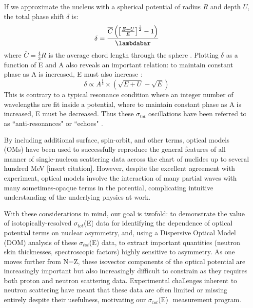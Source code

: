 \documentclass[twocolumn,secnumarabic,amssymb, nobibnotes, aps, prl,
superscriptaddress, nobalancelastpage]{revtex4}
\newcommand{\tots}{\ensuremath{\sigma_{tot}}\,\,}
\newcommand{\totEs}{\ensuremath{\sigma_{tot}}(E)\,\,}
\begin{document}
If we approximate the nucleus with a
spherical potential of radius $R$ and depth $U$, the total phase shift $\delta$ is:
\begin{equation} \label{phaseShift}
    \delta =
    \frac{\overline{C}\left(\left[{\frac{E+U}{E}}\right]^{\frac{1}{2}}-1\right)}{\lambdabar}
\end{equation}
where $\overline{C} = \frac{4}{3}R$ is the average chord length through the
sphere \cite{Angeli1970}. Plotting $\delta$ as a function of E and A also reveals an important
relation: to maintain constant phase as A is increased, E must also increase 
\cite{Satchler1980, Peterson1962}:
\begin{equation}
    \delta \propto A^{\frac{1}{3}}\times\left(\sqrt{E+U}-\sqrt{E}\right)
\end{equation}
This is contrary to a typical resonance condition where an integer number of wavelengths
are fit inside a potential, where to maintain constant phase as A is increased,
E must be decreased. Thus these \tots oscillations have been referred to as
``anti-resonances" or ``echoes" \cite{Satchler1980, McVoy1967}.

By including additional surface, spin-orbit, and other terms, optical models (OMs) have been 
used to successfully reproduce the general features of all manner of single-nucleon scattering 
data across the chart of nuclides up to several hundred MeV [insert citation].
However, despite the excellent agreement with experiment, optical models
involve the interaction of many partial waves with many sometimes-opaque terms
in the potential, complicating intuitive understanding of the underlying
physics at work.

With these considerations in mind, our goal is twofold: to demonstrate the
value of isotopically-resolved \totEs data for identifying the dependence of optical 
potential terms on nuclear asymmetry, and, using a Dispersive Optical Model
(DOM) analysis of these \totEs data, to extract important quantities (neutron skin
thicknesses, spectroscopic factors) highly sensitive to asymmetry.
As one moves further from N=Z, these isovector components of the optical potential
are increasingly important but also increasingly
difficult to constrain as they requires both proton and neutron scattering data. Experimental 
challenges inherent to neutron scattering have meant that these data are often 
limited or missing entirely despite their usefulness, motivating our \totEs
measurement program.

\end{document}
